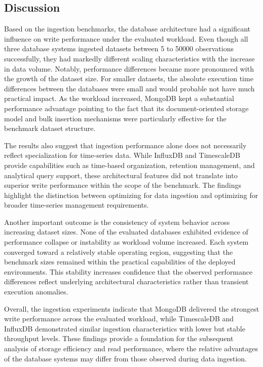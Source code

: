 \subsection{Discussion}
Based on the ingestion benchmarks, the database architecture had a significant influence on write performance under the evaluated workload. Even though all three database systems ingested datasets between 5 to 50000 observations successfully, they had markedly different scaling characteristics with the increase in data volume. Notably, performance differences became more pronounced with the growth of the dataset size. For smaller datasets, the absolute execution time differences between the databases were small and would probable not have much practical impact. As the workload increased, MongoDB kept a substantial performance advantage pointing to the fact that its document-oriented storage model and bulk insertion mechanisms were particularly effective for the benchmark dataset structure. 

The results also suggest that ingestion performance alone does not necessarily reflect specialization for time-series data. While InfluxDB and TimescaleDB provide capabilities such as time-based organization, retention management, and analytical query support, these architectural features did not translate into superior write performance within the scope of the benchmark. The findings highlight the distinction between optimizing for data ingestion and optimizing for broader time-series management requirements.

Another important outcome is the consistency of system behavior across increasing dataset sizes. None of the evaluated databases exhibited evidence of performance collapse or instability as workload volume increased. Each system converged toward a relatively stable operating region, suggesting that the benchmark sizes remained within the practical capabilities of the deployed environments. This stability increases confidence that the observed performance differences reflect underlying architectural characteristics rather than transient execution anomalies.

Overall, the ingestion experiments indicate that MongoDB delivered the strongest write performance across the evaluated workload, while TimescaleDB and InfluxDB demonstrated similar ingestion characteristics with lower but stable throughput levels. These findings provide a foundation for the subsequent analysis of storage efficiency and read performance, where the relative advantages of the database systems may differ from those observed during data ingestion.


